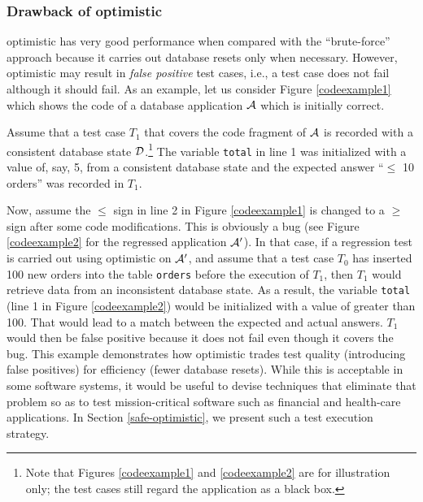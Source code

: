 \documentclass[authoryear,preprint,12pt]{elsarticle}
\begin{document}
      \subsubsection{Drawback of {\sc optimistic}}
      \label{drawbackoptimistic}
{\sc optimistic} has very good performance when compared with the ``brute-force'' approach 
because it carries out database resets only when necessary.
However, {\sc optimistic} may result in \emph{false positive} test cases, i.e., a test case does not fail although it should fail.  
As an example, let us consider Figure \ref{codeexample1} which shows the code of a database application $\cal{A}$ which is initially correct.

Assume that a test case $T_1$ that covers the code fragment of $\cal{A}$ is recorded with a consistent database state $\cal{D}$.\footnote{Note that Figures \ref{codeexample1} and \ref{codeexample2} are for illustration only; the test cases still regard the application as a black box.}
The variable \texttt{total} in line 1 was initialized with a value of, say, 5, from a consistent database state 
and the expected answer ``$ \leq $ 10 orders'' was recorded in $T_1$.

Now, assume the $\leq$ sign in line 2 
in Figure \ref{codeexample1} is changed to a $\geq$ sign after some code modifications.
This is obviously a bug (see Figure \ref{codeexample2} for the regressed application $\cal{A}'$).  
In that case, if a regression test is carried out using {\sc optimistic} on $\cal{A}'$,
and assume that a test case $T_0$ has inserted 100 new orders into the table \texttt{orders}
before the execution of $T_1$,
then $T_1$ would retrieve data from an inconsistent database state.
As a result, the variable {\tt total} (line 1 in Figure \ref{codeexample2}) would be initialized with a value of greater than 100.  
That would lead to a match between the expected and actual answers.
$T_1$ would then be false positive because it does not fail even though it covers the bug.
This example demonstrates how {\sc optimistic} trades test quality (introducing false positives) for efficiency (fewer database resets).
While this is acceptable in some software systems, 
it would be useful to devise techniques that eliminate that problem so as to test mission-critical software such as financial and health-care applications.
In Section \ref{safe-optimistic}, we present such a test execution strategy.
\end{document}
